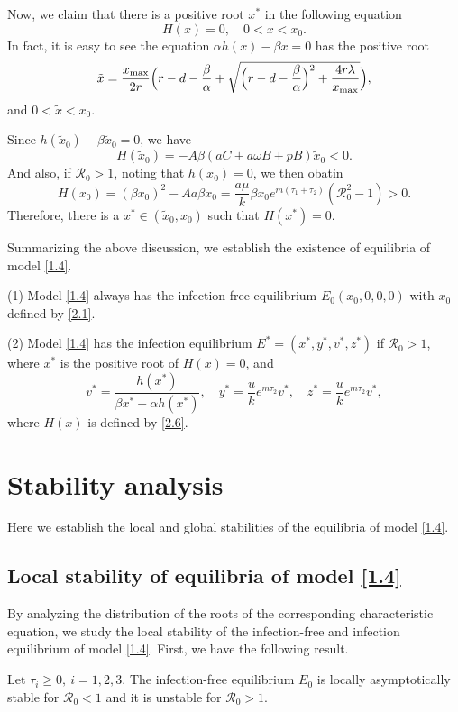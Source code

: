 \documentclass[reqno]{amsart}
\begin{document}
Now, we claim that there is a positive root $x^*$ in the following equation
\[
H(x)=0, \quad  0<x<x_0.
\]
In fact, it is easy to see the equation  $\alpha h(x)-\beta x=0$  has the positive root
$$
\tilde{x}=\frac{x_{\rm max}}{2r}\Big(r-d-\frac{\beta }{\alpha}
+\sqrt{\Big(r-d-\frac{\beta}{\alpha}\Big)^{2}+\frac{4r\lambda}{x_{\rm max}}}\Big),
$$
and  $0<\tilde{x}<x_0$.

Since $h(\tilde{x}_0)-\beta \tilde{x}_0=0$, we have
\[
H(\tilde{x}_0)=-A\beta (aC+a\omega B+pB)\tilde{x}_0<0.
\]
And also, if $\mathcal{R}_0>1$, noting that $h(x_0)=0$, we then obatin
\[
H(x_0)=(\beta x_0)^2-Aa\beta x_0=\frac{a\mu}{k}
\beta x_0e^{m(\tau_1+\tau_2)}(\mathcal{R}_0^{2}-1)>0.
\]
Therefore, there is a $x^*\in (\tilde{x}_0, x_0)$ such that $H(x^*)=0$.

Summarizing the above discussion, we  establish the existence of equilibria of 
model \eqref{1.4}.

\begin{theorem}\label{T2.2}
(1) Model \eqref{1.4} always has the infection-free equilibrium $E_0(x_0,0,0,0)$ with 
$x_0$ defined by \eqref{2.1}.

(2) Model \eqref{1.4} has the infection equilibrium $E^{*}=(x^{*}, y^{*}, v^{*}, z^{*})$ 
if $\mathcal{R}_0>1$, where  $x^*$ is the positive root of $H(x)=0$, and
\[
v^*=\frac{h(x^*)}{\beta x^*-\alpha h(x^*)},\quad 
y^*=\frac{u}{k}e^{m\tau_2}v^*,\quad z^*=\frac{u}{k}e^{m\tau_2}v^*,
\]
where  $H(x)$ is defined by \eqref{2.6}.
\end{theorem}

\section{Stability analysis}

Here  we  establish the local and global stabilities of the equilibria of 
model \eqref{1.4}.

\subsection{Local stability of equilibria of model \eqref{1.4}}

By analyzing the distribution of the roots of the corresponding characteristic equation, 
we  study the local stability of the infection-free and infection
equilibrium of model \eqref{1.4}. First, we have the following result.

\begin{theorem}\label{T3.1}
Let $\tau_{i}\geqslant0,\ i=1,2,3$. The infection-free equilibrium  $E_0$ is 
locally asymptotically stable for $\mathcal{R}_0<1$ and it is unstable for 
$\mathcal{R}_0>1$.
\end{theorem}
\end{document}
